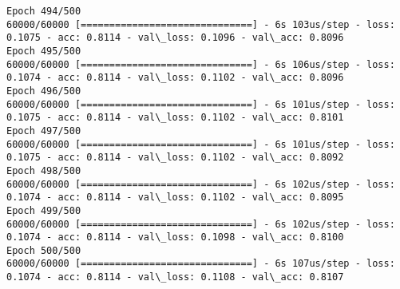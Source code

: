 \documentclass[11pt]{article}
\begin{document}
\begin{Verbatim}[commandchars=\\\{\}]
Epoch 494/500
60000/60000 [==============================] - 6s 103us/step - loss: 0.1075 - acc: 0.8114 - val\_loss: 0.1096 - val\_acc: 0.8096
Epoch 495/500
60000/60000 [==============================] - 6s 106us/step - loss: 0.1074 - acc: 0.8114 - val\_loss: 0.1102 - val\_acc: 0.8096
Epoch 496/500
60000/60000 [==============================] - 6s 101us/step - loss: 0.1075 - acc: 0.8114 - val\_loss: 0.1102 - val\_acc: 0.8101
Epoch 497/500
60000/60000 [==============================] - 6s 101us/step - loss: 0.1075 - acc: 0.8114 - val\_loss: 0.1102 - val\_acc: 0.8092
Epoch 498/500
60000/60000 [==============================] - 6s 102us/step - loss: 0.1074 - acc: 0.8114 - val\_loss: 0.1102 - val\_acc: 0.8095
Epoch 499/500
60000/60000 [==============================] - 6s 102us/step - loss: 0.1074 - acc: 0.8114 - val\_loss: 0.1098 - val\_acc: 0.8100
Epoch 500/500
60000/60000 [==============================] - 6s 107us/step - loss: 0.1074 - acc: 0.8114 - val\_loss: 0.1108 - val\_acc: 0.8107

    \end{Verbatim}
\end{document}
